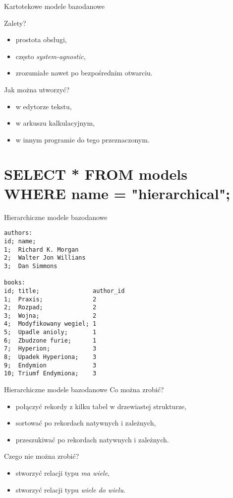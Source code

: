 \begin{frame}[fragile]{Kartotekowe modele bazodanowe}

	Zalety?
	\begin{itemize}
		\item prostota obsługi,
		\item często \emph{system-agnostic},
		\item zrozumiałe nawet po bezpośrednim otwarciu.
	\end{itemize}
	
	Jak można utworzyć?
	\begin{itemize}
		\item w edytorze tekstu,
		\item w arkuszu kalkulacyjnym,
		\item w innym programie do tego przeznaczonym.
	\end{itemize}
\end{frame}

\section{SELECT * FROM models WHERE name = "hierarchical";}

\begin{frame}[fragile]{Hierarchiczne modele bazodanowe}
	\begin{lstlisting}
authors:
id; name;
1;  Richard K. Morgan
2;  Walter Jon Willians
3;  Dan Simmons

books:
id; title;               author_id
1;  Praxis;              2
2;  Rozpad;              2
3;  Wojna;               2
4;  Modyfikowany wegiel; 1
5;  Upadle anioly;       1
6;  Zbudzone furie;      1
7;  Hyperion;            3
8;  Upadek Hyperiona;    3
9;  Endymion             3
10; Triumf Endymiona;    3
	\end{lstlisting}
\end{frame}

\begin{frame}[fragile]{Hierarchiczne modele bazodanowe}
	Co można zrobić?
	\begin{itemize}
		\item połączyć rekordy z kilku tabel w drzewiastej strukturze,
		\item sortować po rekordach natywnych i zależnych,
		\item przeszukiwać po rekordach natywnych i zależnych.
	\end{itemize}
	
	Czego nie można zrobić?
	\begin{itemize}
		\item stworzyć relacji typu \emph{ma wiele},
		\item stworzyć relacji typu \emph{wiele do wielu}.
	\end{itemize}
\end{frame}

